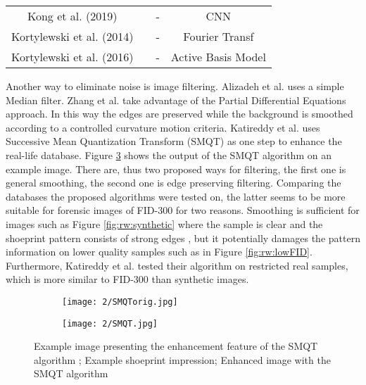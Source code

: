 \documentclass[draft,final]{vutinfth} %
\begin{document}
\begin{sidewaystable}
\begin{minipage}{\linewidth}
\begin{tabular}{c|c|c|c}
Kong et al. (2019) \cite{kong2019cross} & & - & CNN \\
Kortylewski et al. (2014) \cite{kortylewski2014unsupervised} & & - & Fourier Transf \\
Kortylewski et al. (2016) \cite{kortylewski2016probabilistic} & & - & Active Basis Model \\
\end{tabular}
\label{tab:ref:alg} 
\end{minipage}
\end{sidewaystable}

\par
Another way to eliminate noise is image filtering.
Alizadeh et al. \cite{alizadeh2017automatic} uses a simple Median filter.
Zhang et al. \cite{zhang2005automatic} take advantage of the Partial Differential Equations approach.
In this way the edges are preserved while the background is smoothed according to a controlled curvature motion criteria. 
Katireddy et al. \cite{katireddy2017novel} uses Successive Mean Quantization Transform (SMQT) \cite{nilsson2013smqt} as one step to enhance the real-life database.
Figure \ref{fig:rw:SMQT} shows the output of the SMQT algorithm on an example image.
There are, thus two proposed ways for filtering, the first one is general smoothing, the second one is edge preserving filtering.
Comparing the databases the proposed algorithms were tested on, the latter seems to be more suitable for forensic images of FID-300 for two reasons.
Smoothing is sufficient for images such as Figure \ref{fig:rw:synthetic} where the sample is clear and the shoeprint pattern consists of strong edges \cite{alizadeh2017automatic}, but it potentially damages the pattern information on lower quality samples such as in Figure \ref{fig:rw:lowFID}.
Furthermore, Katireddy et al. \cite{katireddy2017novel} tested their algorithm on restricted real samples, which is more similar to FID-300 than synthetic images. 

\begin{figure}[h]
  \centering
  \begin{subfigure}[t]{0.4\columnwidth}
    \centering
    \texttt{[image: 2/SMQTorig.jpg]}
    \subcaption{}
    \label{fig:rw:SMQTin}
  \end{subfigure}
  \begin{subfigure}[t]{0.4\columnwidth}
    \centering
    \texttt{[image: 2/SMQT.jpg]}
    \subcaption{}
    \label{fig:rw:SMQTout}
  \end{subfigure}
  \caption{Example image presenting the enhancement feature of the SMQT algorithm \cite{katireddy2017novel};
		 Example shoeprint impression;  Enhanced image with the SMQT algorithm}
  \label{fig:rw:SMQT} %
\end{figure}
\end{document}
